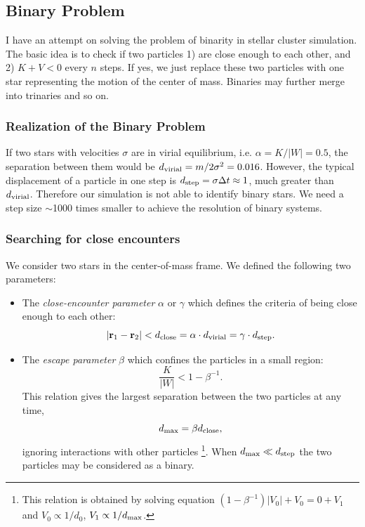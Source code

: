 \subsection*{Binary Problem}
I have an attempt on solving the problem of binarity in stellar cluster simulation.
The basic idea is to check if two particles 1) are close enough to each other, and 2) $ K + V 
< 0 $ every $ n $ steps. If yes, we just replace these two particles with one star 
representing the motion of the center of mass. Binaries may further merge into trinaries 
and so on.

\subsubsection*{Realization of the Binary Problem}
If two stars with velocities $ \sigma $ are in virial equilibrium, i.e. $ \alpha = K/|W| = 0.5 
$, the separation between them would be $ d_{\rm virial} = m /2 \sigma^2 = 0.016 $. 
However, the typical displacement of a particle in one step is $ d_{\rm step} = \sigma \Delta 
t \approx 1 $, much greater than $ d_{\rm virial} $. Therefore our simulation is not able to 
identify binary stars. We need a step size $ \sim $1000 times smaller to achieve the 
resolution of binary systems.

\subsubsection*{Searching for close encounters}
We consider two stars in the center-of-mass frame. We defined the following two 
parameters:
\begin{itemize}
	\item The \textit{close-encounter parameter} $ \alpha $ or $ \gamma $ which defines the 
	criteria of being close enough to each other:
	\begin{equation}\label{eq:r12}
	| \mathbf{r}_1 - \mathbf{r}_2 | < d_{\rm close} = \alpha \cdot d_{\rm virial} = \gamma \cdot d_{\rm step}.
	\end{equation}
	\item The \textit{escape parameter} $ \beta $ which confines the particles in a small 
	region:
	\begin{equation}\label{key}
	\frac{K}{|W|} < 1 - \beta^{-1}.
	\end{equation}
	This relation gives the largest separation between the two particles at any time, 
	\begin{equation}
	d_{\rm max} = \beta d_{\rm close},
	\end{equation}
	ignoring interactions with other particles
	\footnote{This relation is obtained by solving  equation $ (1 - \beta^{-1}) |V_0| + V_0 = 0 
	+ V_1 $ and $ V_0 \propto 1/d_0 $,	$ V_1 \propto 1/d_{\rm max} $.}.
	When $ d_{\rm max} \ll d_{\rm step} $ the two particles may be considered as a 
	binary.
\end{itemize}

